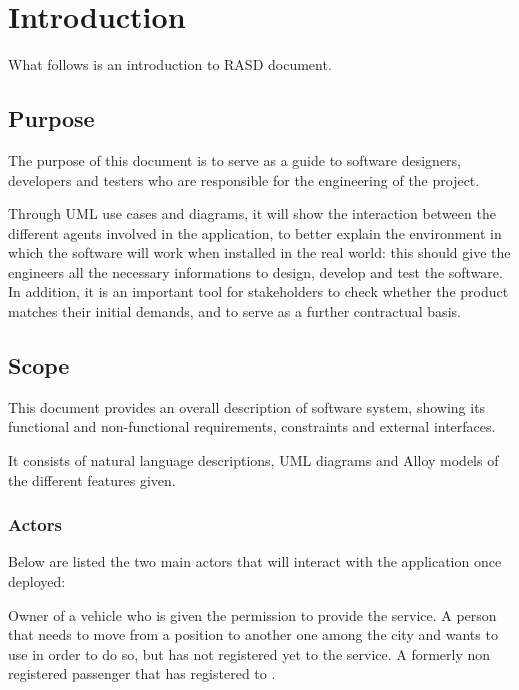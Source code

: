 \section{Introduction}      %
What follows is an introduction to \myTaxiService{} RASD document.
\subsection{Purpose}
The purpose of this document is to serve as a guide to software designers, developers and testers who are responsible for the engineering of the \myTaxiService{} project.\par
Through UML use cases and diagrams, it will show the interaction between the different agents involved in the application, to better explain the environment in which the software will work when installed in the real world: this should give the engineers all the necessary informations to design, develop and test the software.
In addition, it is an important tool for stakeholders to check whether the product matches their initial demands, and to serve as a further contractual basis.
\subsection{Scope}
This document provides an overall description of \myTaxiService{} software system, showing its functional and non-functional requirements, constraints and external interfaces.\par
It consists of natural language descriptions, UML diagrams and Alloy models of the different features given.
\subsubsection{Actors}
Below are listed the two main actors that will interact with the application once deployed:
\begin{itemize}
		Owner of a vehicle who is given the permission to provide the service.
	 A person that needs to move from a position to another one among the city and wants to use \myTaxiService{} in order to do so, but has not registered yet to the service.
	 A formerly non registered passenger that has registered to \myTaxiService{}.
\end{itemize}
